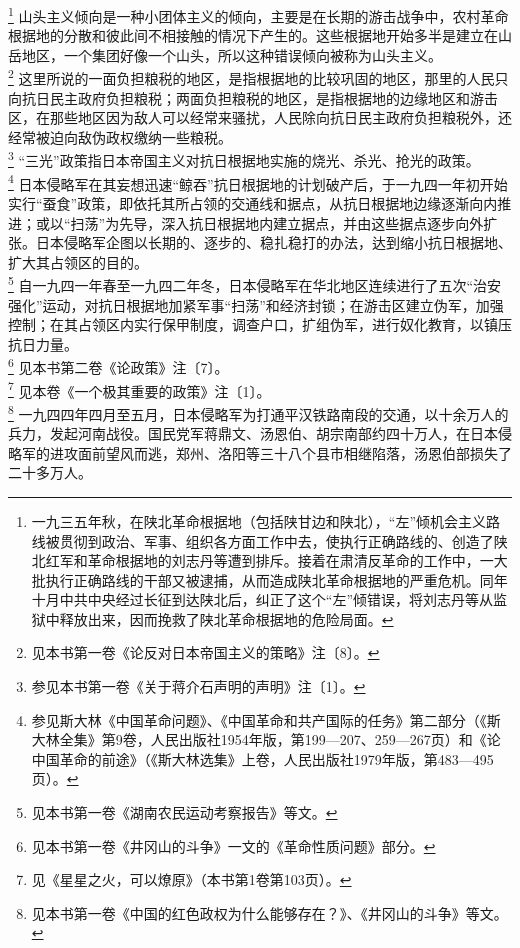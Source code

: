 \documentclass[cn,11pt,chinese]{elegantbook}
\begin{document}
\footnote[12]{ 一九三五年秋，在陕北革命根据地（包括陕甘边和陕北），“左”倾机会主义路线被贯彻到政治、军事、组织各方面工作中去，使执行正确路线的、创造了陕北红军和革命根据地的刘志丹等遭到排斥。接着在肃清反革命的工作中，一大批执行正确路线的干部又被逮捕，从而造成陕北革命根据地的严重危机。同年十月中共中央经过长征到达陕北后，纠正了这个“左”倾错误，将刘志丹等从监狱中释放出来，因而挽救了陕北革命根据地的危险局面。} 山头主义倾向是一种小团体主义的倾向，主要是在长期的游击战争中，农村革命根据地的分散和彼此间不相接触的情况下产生的。这些根据地开始多半是建立在山岳地区，一个集团好像一个山头，所以这种错误倾向被称为山头主义。\\
\footnote[13]{ 见本书第一卷《论反对日本帝国主义的策略》注〔8〕。} 这里所说的一面负担粮税的地区，是指根据地的比较巩固的地区，那里的人民只向抗日民主政府负担粮税；两面负担粮税的地区，是指根据地的边缘地区和游击区，在那些地区因为敌人可以经常来骚扰，人民除向抗日民主政府负担粮税外，还经常被迫向敌伪政权缴纳一些粮税。\\
\footnote[14]{ 参见本书第一卷《关于蒋介石声明的声明》注〔1〕。} “三光”政策指日本帝国主义对抗日根据地实施的烧光、杀光、抢光的政策。\\
\footnote[15]{ 参见斯大林《中国革命问题》、《中国革命和共产国际的任务》第二部分（《斯大林全集》第9卷，人民出版社1954年版，第199—207、259—267页）和《论中国革命的前途》（《斯大林选集》上卷，人民出版社1979年版，第483—495页）。} 日本侵略军在其妄想迅速“鲸吞”抗日根据地的计划破产后，于一九四一年初开始实行“蚕食”政策，即依托其所占领的交通线和据点，从抗日根据地边缘逐渐向内推进；或以“扫荡”为先导，深入抗日根据地内建立据点，并由这些据点逐步向外扩张。日本侵略军企图以长期的、逐步的、稳扎稳打的办法，达到缩小抗日根据地、扩大其占领区的目的。\\
\footnote[16]{ 见本书第一卷《湖南农民运动考察报告》等文。} 自一九四一年春至一九四二年冬，日本侵略军在华北地区连续进行了五次“治安强化”运动，对抗日根据地加紧军事“扫荡”和经济封锁；在游击区建立伪军，加强控制；在其占领区内实行保甲制度，调查户口，扩组伪军，进行奴化教育，以镇压抗日力量。\\
\footnote[17]{ 见本书第一卷《井冈山的斗争》一文的《革命性质问题》部分。} 见本书第二卷《论政策》注〔7〕。\\
\footnote[18]{ 见《星星之火，可以燎原》（本书第1卷第103页）。} 见本卷《一个极其重要的政策》注〔1〕。\\
\footnote[19]{ 见本书第一卷《中国的红色政权为什么能够存在？》、《井冈山的斗争》等文。} 一九四四年四月至五月，日本侵略军为打通平汉铁路南段的交通，以十余万人的兵力，发起河南战役。国民党军蒋鼎文、汤恩伯、胡宗南部约四十万人，在日本侵略军的进攻面前望风而逃，郑州、洛阳等三十八个县市相继陷落，汤恩伯部损失了二十多万人。\\
\end{document}
